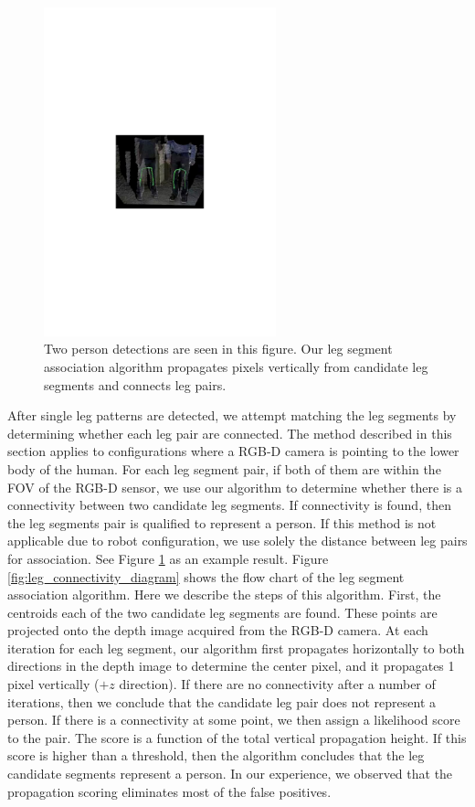 \begin{figure}[ht!]
\centering
\includegraphics[width=0.6\textwidth]{pics/leg_connectivity}
\caption{Two person detections are seen in this figure. Our leg segment association algorithm propagates pixels vertically from candidate leg segments and connects leg pairs.}
\label{fig:leg_connectivity}
\end{figure}


After single leg patterns are detected, we attempt matching the leg segments by determining whether each leg pair are connected. The method described in this section applies to configurations where a RGB-D camera is pointing to the lower body of the human. For each leg segment pair, if both of them are within the FOV of the RGB-D sensor, we use our algorithm to determine whether there is a connectivity between two candidate leg segments. If connectivity is found, then the leg segments pair is qualified to represent a person. If this method is not applicable due to robot configuration, we use solely the distance between leg pairs for association. See Figure \ref{fig:leg_connectivity} as an example result. Figure \ref{fig:leg_connectivity_diagram} shows the flow chart of the leg segment association algorithm. Here we describe the steps of this algorithm. First, the centroids each of the two candidate leg segments are found.  These points are projected onto the depth image acquired from the RGB-D camera. At each iteration for each leg segment, our algorithm first propagates horizontally to both directions in the depth image to determine the center pixel, and it propagates 1 pixel vertically ($+z$ direction). If there are no connectivity after a number of iterations, then we conclude that the candidate leg pair does not represent a person. If there is a connectivity at some point, we then assign a likelihood score to the pair. The score is a function of the total vertical propagation height. If this score is higher than a threshold, then the algorithm concludes that the leg candidate segments represent a person. In our experience, we observed that the propagation scoring eliminates most of the false positives.


